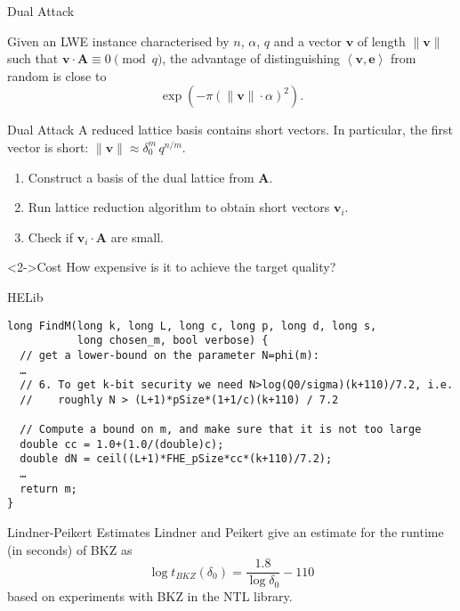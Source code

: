\documentclass[presentation,smaller]{beamer}
\renewcommand{\vec}[1]{\ensuremath{\mathbf{#1}}\xspace}
\newcommand{\ip}[2]{\ensuremath{\left\langle {#1},{#2}\right\rangle}\xspace}
\begin{document}
\begin{frame}[label={sec:orgbf864ac}]{Dual Attack}
\begin{lemma}
Given an LWE instance characterised by \(n\), \(α\), \(q\) and a vector \(\vec{v}\) of length \(\|\vec{v}\|\) such that \(\vec{v} ⋅ \vec{A} \equiv 0 \pmod{q}\), the advantage of distinguishing \(\ip{\vec{v}}{\vec{e}}\) from random is close to  \[\exp(-π(\|\vec{v}\| ⋅ α)^2).\]
\end{lemma}
\end{frame}

\begin{frame}[label={sec:orgf44ccfb}]{Dual Attack}
A \alert{reduced lattice} basis contains short vectors. In particular, the first vector is short: \(\|\vec{v}\| ≈ δ_0^m\, q^{n/m}\).

\begin{enumerate}
\item Construct a basis of the dual lattice from \(\vec{A}\).
\item Run lattice reduction algorithm to obtain short vectors \(\vec{v}_i\).
\item Check if \(\vec{v}_i⋅ \vec{A}\) are small.
\end{enumerate}

\begin{block}<2->{Cost}
How expensive is it to achieve the target quality?
\end{block}
\end{frame}

\begin{frame}[fragile,label={sec:org97fe5a7}]{HELib}
 \lstset{language=C++,label= ,caption= ,captionpos=b,numbers=none}
\begin{lstlisting}
long FindM(long k, long L, long c, long p, long d, long s,
           long chosen_m, bool verbose) {
  // get a lower-bound on the parameter N=phi(m):
  …
  // 6. To get k-bit security we need N>log(Q0/sigma)(k+110)/7.2, i.e.
  //    roughly N > (L+1)*pSize*(1+1/c)(k+110) / 7.2

  // Compute a bound on m, and make sure that it is not too large
  double cc = 1.0+(1.0/(double)c);
  double dN = ceil((L+1)*FHE_pSize*cc*(k+110)/7.2);
  …
  return m;
}
\end{lstlisting}
\end{frame}

\begin{frame}[label={sec:org94bb15e}]{Lindner-Peikert Estimates}
Lindner and Peikert  give an estimate for the runtime (in seconds) of BKZ as \[\log{t_{BKZ}(δ_0)} = \frac{1.8}{\log{δ_0}}-110\] based on experiments with BKZ in the NTL library.
\end{frame}
\end{document}
